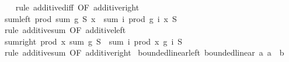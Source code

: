 \begin{isabellebody}
%
\isadelimproof
\ \ %
\endisadelimproof
%
\isatagproof
{}\isamarkupfalse%
\ {\isacharparenleft}{\kern0pt}rule\ additive{\isachardot}{\kern0pt}diff\ {\isacharbrackleft}{\kern0pt}OF\ additive{\isacharunderscore}{\kern0pt}right{\isacharbrackright}{\kern0pt}{\isacharparenright}{\kern0pt}%
\endisatagproof
{\isafoldproof}%
%
\isadelimproof
\isanewline
%
\endisadelimproof
\isanewline
{}\isamarkupfalse%
\ sum{\isacharunderscore}{\kern0pt}left{\isacharcolon}{\kern0pt}\ {\isachardoublequoteopen}prod\ {\isacharparenleft}{\kern0pt}sum\ g\ S{\isacharparenright}{\kern0pt}\ x\ {\isacharequal}{\kern0pt}\ sum\ {\isacharparenleft}{\kern0pt}{\isacharparenleft}{\kern0pt}{\isasymlambda}i{\isachardot}{\kern0pt}\ prod\ {\isacharparenleft}{\kern0pt}g\ i{\isacharparenright}{\kern0pt}\ x{\isacharparenright}{\kern0pt}{\isacharparenright}{\kern0pt}\ S{\isachardoublequoteclose}\isanewline
%
\isadelimproof
\ \ %
\endisadelimproof
%
\isatagproof
{}\isamarkupfalse%
\ {\isacharparenleft}{\kern0pt}rule\ additive{\isachardot}{\kern0pt}sum\ {\isacharbrackleft}{\kern0pt}OF\ additive{\isacharunderscore}{\kern0pt}left{\isacharbrackright}{\kern0pt}{\isacharparenright}{\kern0pt}%
\endisatagproof
{\isafoldproof}%
%
\isadelimproof
\isanewline
%
\endisadelimproof
\isanewline
{}\isamarkupfalse%
\ sum{\isacharunderscore}{\kern0pt}right{\isacharcolon}{\kern0pt}\ {\isachardoublequoteopen}prod\ x\ {\isacharparenleft}{\kern0pt}sum\ g\ S{\isacharparenright}{\kern0pt}\ {\isacharequal}{\kern0pt}\ sum\ {\isacharparenleft}{\kern0pt}{\isacharparenleft}{\kern0pt}{\isasymlambda}i{\isachardot}{\kern0pt}\ {\isacharparenleft}{\kern0pt}prod\ x\ {\isacharparenleft}{\kern0pt}g\ i{\isacharparenright}{\kern0pt}{\isacharparenright}{\kern0pt}{\isacharparenright}{\kern0pt}{\isacharparenright}{\kern0pt}\ S{\isachardoublequoteclose}\isanewline
%
\isadelimproof
\ \ %
\endisadelimproof
%
\isatagproof
{}\isamarkupfalse%
\ {\isacharparenleft}{\kern0pt}rule\ additive{\isachardot}{\kern0pt}sum\ {\isacharbrackleft}{\kern0pt}OF\ additive{\isacharunderscore}{\kern0pt}right{\isacharbrackright}{\kern0pt}{\isacharparenright}{\kern0pt}%
\endisatagproof
{\isafoldproof}%
%
\isadelimproof
\isanewline
%
\endisadelimproof
\isanewline
\isanewline
{}\isamarkupfalse%
\ bounded{\isacharunderscore}{\kern0pt}linear{\isacharunderscore}{\kern0pt}left{\isacharcolon}{\kern0pt}\ {\isachardoublequoteopen}bounded{\isacharunderscore}{\kern0pt}linear\ {\isacharparenleft}{\kern0pt}{\isasymlambda}a{\isachardot}{\kern0pt}\ a\ {\isacharasterisk}{\kern0pt}{\isacharasterisk}{\kern0pt}\ b{\isacharparenright}{\kern0pt}{\isachardoublequoteclose}\isanewline

\end{isabellebody}
